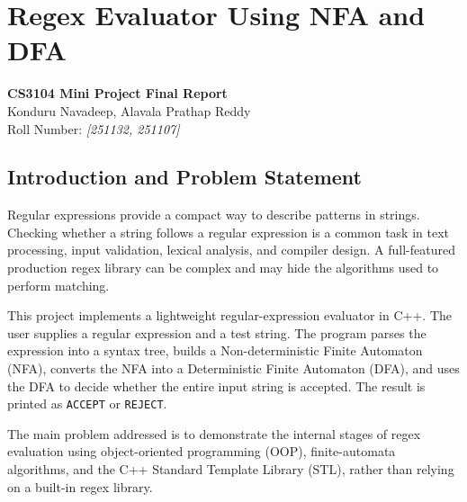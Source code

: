 \documentclass[12pt,a4paper]{report}
\begin{document}
\setcounter{chapter}{11}
\setcounter{secnumdepth}{3}
\chapter{Regex Evaluator Using NFA and DFA}
\begin{center}
\textbf{CS3104 Mini Project Final Report}\\[0.4em]
Konduru Navadeep, Alavala Prathap Reddy\\
Roll Number: \textit{[251132, 251107]}
\end{center}
\vspace{0.5em}
\tableofcontents
\clearpage



\section{Introduction and Problem Statement}
Regular expressions provide a compact way to describe patterns in strings. Checking whether a string follows a regular expression is a common task in text processing, input validation, lexical analysis, and compiler design. A full-featured production regex library can be complex and may hide the algorithms used to perform matching.

This project implements a lightweight regular-expression evaluator in C++. The user supplies a regular expression and a test string. The program parses the expression into a syntax tree, builds a Non-deterministic Finite Automaton (NFA), converts the NFA into a Deterministic Finite Automaton (DFA), and uses the DFA to decide whether the entire input string is accepted. The result is printed as \texttt{ACCEPT} or \texttt{REJECT}.

The main problem addressed is to demonstrate the internal stages of regex evaluation using object-oriented programming (OOP), finite-automata algorithms, and the C++ Standard Template Library (STL), rather than relying on a built-in regex library.
\end{document}
